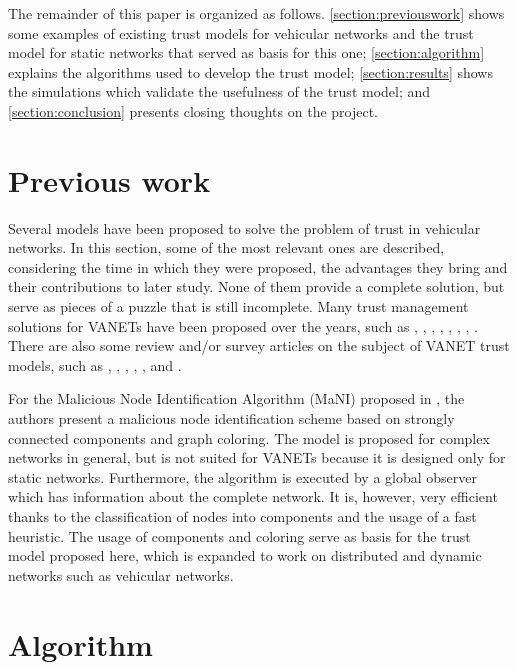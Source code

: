 \documentclass[conference]{IEEEtran}
\begin{document}
The remainder of this paper is organized as follows. \autoref{section:previouswork} shows some examples of existing trust models for vehicular networks and the trust model for static networks that served as basis for this one; \autoref{section:algorithm} explains the algorithms used to develop the trust model; \autoref{section:results} shows the simulations which validate the usefulness of the trust model; and \autoref{section:conclusion} presents closing thoughts on the project.

\section{Previous work}
\label{section:previouswork}

Several models have been proposed to solve the problem of trust in vehicular networks. 
In this section, some of the most relevant ones are described, considering the time in which they were proposed, the advantages they bring and their contributions to later study. 
None of them provide a complete solution, but serve as pieces of a puzzle that is still incomplete. 
Many trust management solutions for VANETs have been proposed over the years, such as \cite{patwardhan2006data}, \cite{gerlach2007trust}, \cite{raya2008data}, \cite{huang2010situation}, \cite{ding2013novel}, \cite{haddadou2013trust}, \cite{liu2016lsot}, \cite{kerrache2016detection}.
There are also some review and/or survey articles on the subject of VANET trust models, such as \cite{zhang2011survey}, \cite{ma2011survey}, \cite{zhang2012trust}, \cite{mejri2014survey}, \cite{soleymani2015trust} \cite{sengar2016survey}, and \cite{dwivedi2016review}.

For the Malicious Node Identification Algorithm (MaNI) proposed in \cite{vernize2015malicious}, the authors present a malicious node identification scheme based on strongly connected components and graph coloring.
The model is proposed for complex networks in general, but is not suited for VANETs because it is designed only for static networks.
Furthermore, the algorithm is executed by a global observer which has information about the complete network.
It is, however, very efficient thanks to the classification of nodes into components and the usage of a fast heuristic.
The usage of components and coloring serve as basis for the trust model proposed here, which is expanded to work on distributed and dynamic networks such as vehicular networks.


\section{Algorithm}
\label{section:algorithm}
\end{document}
